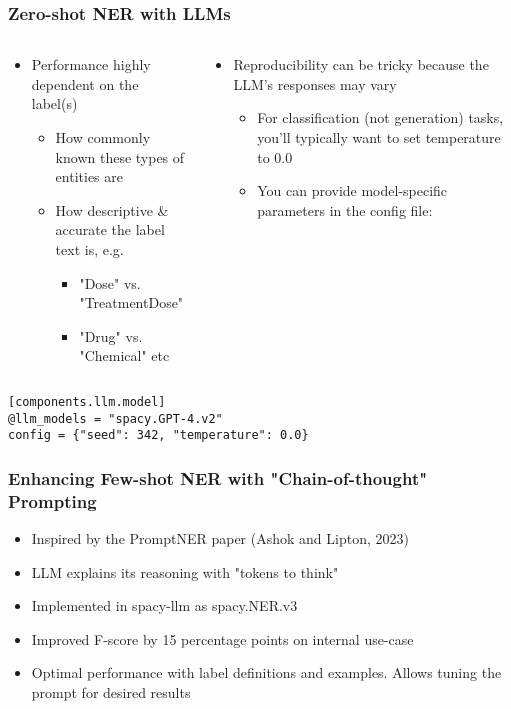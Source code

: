 \begin{frame}[fragile]\frametitle{Zero-shot NER with LLMs}
\begin{columns}
\begin{column}{0.5\textwidth}
\begin{itemize}
\item Performance highly dependent on the label(s)
\begin{itemize}
\item How commonly known these types of entities are
\item How descriptive \& accurate the label text is, e.g.
\begin{itemize}
\item "Dose" vs. "TreatmentDose"
\item "Drug" vs. "Chemical" etc
\end{itemize}
\end{itemize}
\end{itemize}
\end{column}
\begin{column}{0.5\textwidth}
\begin{itemize}
\item Reproducibility can be tricky because the LLM's responses may vary
\begin{itemize}
\item For classification (not generation) tasks, you'll typically want to set temperature to 0.0
\item You can provide model-specific parameters in the config file:
\end{itemize}
\end{itemize}
\end{column}
\end{columns}

\begin{lstlisting}
[components.llm.model]
@llm_models = "spacy.GPT-4.v2"
config = {"seed": 342, "temperature": 0.0}
\end{lstlisting}

\end{frame}

\begin{frame}[fragile]\frametitle{Enhancing Few-shot NER with "Chain-of-thought" Prompting}
\begin{itemize}
\item Inspired by the PromptNER paper (Ashok and Lipton, 2023)
\item LLM explains its reasoning with "tokens to think"
\item Implemented in spacy-llm as spacy.NER.v3
\item Improved F-score by 15 percentage points on internal use-case
\item Optimal performance with label definitions and examples. Allows tuning the prompt for desired results
\end{itemize}
\end{frame}

